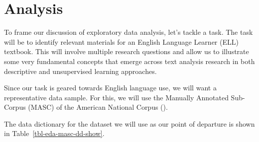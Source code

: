 \documentclass[
  letterpaper,
  DIV=11,
  numbers=noendperiod]{scrreprt}
\theoremstyle{definition}
\theoremstyle{remark}
\begin{document}
\section{Analysis}\label{sec-eda-analysis}

To frame our discussion of exploratory data analysis, let's tackle a
task. The task will be to identify relevant materials for an English
Language Learner (ELL) textbook. This will involve multiple research
questions and allow us to illustrate some very fundamental concepts that
emerge across text analysis research in both descriptive and
unsupervised learning approaches.

Since our task is geared towards English language use, we will want a
representative data sample. For this, we will use the Manually Annotated
Sub-Corpus (MASC) of the American National Corpus
().

The data dictionary for the dataset we will use as our point of
departure is shown in Table~\ref{tbl-eda-masc-dd-show}.
\end{document}
